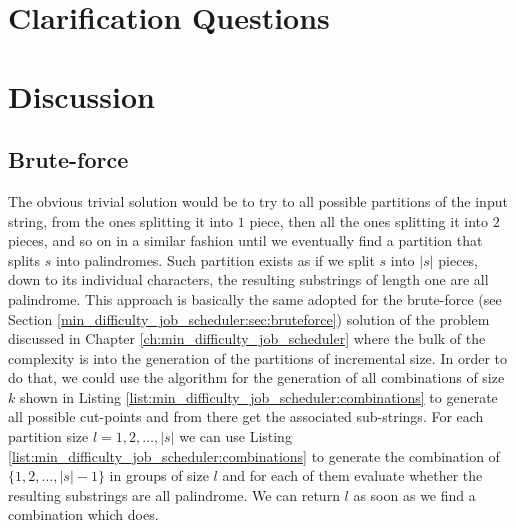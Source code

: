 \section{Clarification Questions}

\begin{QandA}
	\item \begin{questionitem} \begin{question}   \end{question} 	 
    \begin{answered}
		\textit{}
	\end{answered} \end{questionitem}
	
\end{QandA}

\section{Discussion}
\label{palindrome_partitioning2:sec:discussion}


\subsection{Brute-force}
\label{palindrome_partitioning2:sec:bruteforce}
The obvious trivial solution would be to try to all possible partitions of the input string, from
the ones splitting it into $1$ piece, then all the ones splitting it into $2$ pieces, and so on in a
similar fashion until we eventually find a partition that splits $s$ into palindromes. Such
partition exists as if we split $s$ into $|s|$ pieces, down to its individual characters, the
resulting substrings of length one are all palindrome. This approach is basically the same adopted
for the brute-force (see Section \ref{min_difficulty_job_scheduler:sec:bruteforce}) solution of the
problem discussed in Chapter \ref{ch:min_difficulty_job_scheduler} where the bulk of the complexity
is into the generation of the partitions of incremental size. In order to do that, we could use the
algorithm for the generation of all combinations of size $k$ shown in Listing
\ref{list:min_difficulty_job_scheduler:combinations} to generate all possible cut-points and from
there get the associated sub-strings. For each partition size $l = 1,2,\ldots,|s|$ we can use
Listing \ref{list:min_difficulty_job_scheduler:combinations} to generate the combination of
$\{1,2,\ldots,|s|-1\}$ in groups of size $l$ and for each of them evaluate whether the resulting
substrings are all palindrome. We can return $l$ as soon as we find a combination which does.

